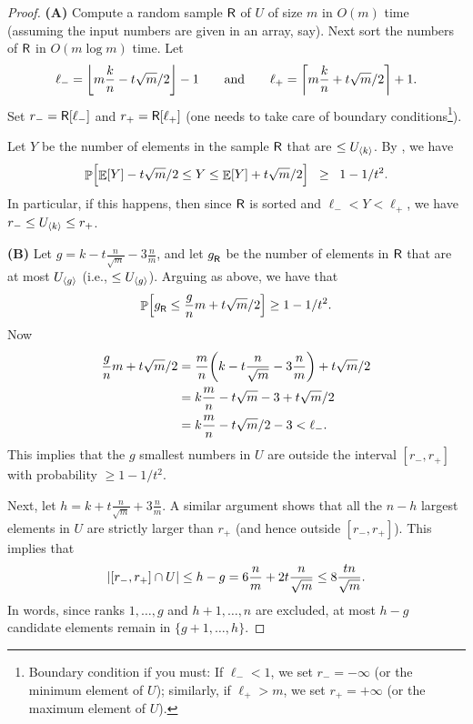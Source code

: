 \begin{proof}
    \textbf{(A)} Compute a random sample $\mathsf{R}$ of $U$ of size $m$
    in $O(m)$ time (assuming the input numbers are given in an array,
    say). Next sort the numbers of $\mathsf{R}$ in $O( m \log m)$
    time. Let
    \begin{equation*}
        \ell_{-} = \floor{m \frac{k}{n} - t \sqrt{m}/2 }-1
        \qquad \text{and} \qquad%
        \ell_{+} = \ceil{m \frac{k}{n} + t \sqrt{m}/2 }+1.
    \end{equation*}
    Set $r_{-} = \mathsf{R}[ \ell_{-}]$ and $r_+ = \mathsf{R}[ \ell_{+}]$ (one needs
    to take care of boundary conditions\footnote{Boundary condition if
       you must: If $\ell_- < 1$, we set $r_- = -\infty$ (or the minimum element
       of $U$); similarly, if $\ell_+ > m$, we set $r_+ = +\infty$ (or the
       maximum element of $U$).}).

    Let $Y$ be the number of elements in the sample $\mathsf{R}$ that are
    $\leq U_{\langle k\rangle}$.  By , we have
    \begin{equation*}
        \ds%
        \Prob{\Bigl. \Ex{Y} - t \sqrt{m}/2 \leq Y \leq \Ex{Y} + t \sqrt{m}/2
        }
        \GEQ
        1- {1}/{t^2}.
    \end{equation*}
    In particular, if this happens, then since $\mathsf{R}$ is sorted and
    $\ell_- < Y < \ell_+$, we have $r_- \leq U_{\langle k\rangle} \leq r_+$. %

    \bigskip%
    \noindent
    \textbf{(B)} Let $g= k - t \frac{n}{\sqrt{m}} -3\frac{n}{m}$, and let
    $g^{}_{\mathsf{R}}$ be the number of elements in $\mathsf{R}$ that are at
    most $U_{\langle g\rangle}$ (i.e., $\leq U_{\langle g\rangle}$). Arguing as above, we
    have that
    \begin{equation*}
        \Prob{ g^{}_\Sample \leq \frac{g}{n} m + t \sqrt{m}/2 } \geq
        1- {1}/{t^2}.
    \end{equation*}
    Now
    \begin{align*}
      \frac{g}{n} m + t \sqrt{m}/2 %
      &=
      \frac{m}{n}\pth{
      k - t \frac{n}{\sqrt{m}} -3\frac{n}{m} }  +  t \sqrt{m}/2
      \\&=
      k \frac{m}{n} - t \sqrt{m}  -3 +  t \sqrt{m}/2
      \\&=
      k \frac{m}{n} - t \sqrt{m}/2  -3
      < \ell_{-}.
    \end{align*}
    This implies that the $g$ smallest numbers in $U$ are outside the
    interval $[r_-,r_+]$ with probability $\geq 1-1/t^2$.

    Next, let $h= k + t \frac{n}{\sqrt{m}} +3\frac{n}{m}$. A similar
    argument shows that all the $n-h$ largest elements in $U$ are
    strictly larger than $r_+$ (and hence outside $[r_-, r_+]$).  This
    implies that
    \begin{equation*}
      \cardin{[r_-, r_+] \cap U} \leq h-g = 6 \frac{n}{m} + 2t
      \frac{n}{\sqrt{m}}%
      \leq%
      8 \frac{tn}{\sqrt{m}}.
  \end{equation*}
  In words, since ranks $1,\dots,g$ and $h+1,\dots,n$ are excluded, at
  most $h-g$ candidate elements remain in $\{g+1,\dots,h\}$.
\end{proof}

